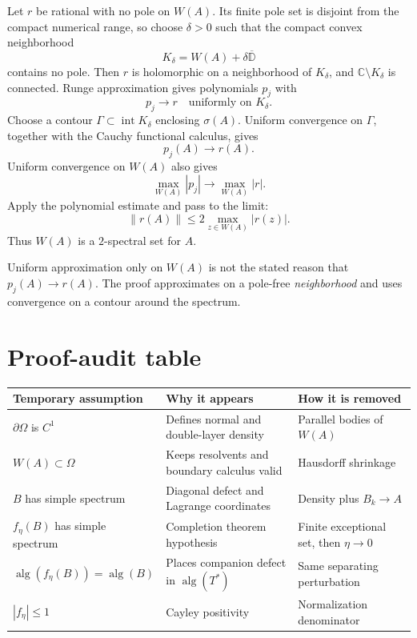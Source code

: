 \documentclass[11pt,oneside,openany]{book}
\theoremstyle{definition}
\theoremstyle{remark}
\newcommand{\C}{\mathbb C}
\newcommand{\D}{\mathbb D}
\newcommand{\alg}{\operatorname{alg}}
\newcommand{\spec}{\sigma}
\newcommand{\norm}[1]{\left\lVert #1\right\rVert}
\newcommand{\olD}{\overline{\D}}
\begin{document}
Let \(r\) be rational with no pole on \(W(A)\).  Its finite pole set is
disjoint from the compact numerical range, so choose \(\delta>0\) such
that the compact convex neighborhood
\[
  K_\delta=W(A)+\delta\olD
\]
contains no pole.  Then \(r\) is holomorphic on a neighborhood of
\(K_\delta\), and \(\C\setminus K_\delta\) is connected.  Runge
approximation gives polynomials \(p_j\) with
\[
  p_j\longrightarrow r
  \quad\text{uniformly on }K_\delta.
\]
Choose a contour
\(\Gamma\subset\operatorname{int}K_\delta\) enclosing
\(\spec(A)\).  Uniform convergence on \(\Gamma\), together with the
Cauchy functional calculus, gives
\[
  p_j(A)\longrightarrow r(A).
\]
Uniform convergence on \(W(A)\) also gives
\[
  \max_{W(A)}|p_j|
  \longrightarrow\max_{W(A)}|r|.
\]
Apply the polynomial estimate and pass to the limit:
\[
  \norm{r(A)}
  \leq2\max_{z\in W(A)}|r(z)|.
\]
Thus \(W(A)\) is a \(2\)-spectral set for \(A\).

\begin{pitfall}
Uniform approximation only on \(W(A)\) is not the stated reason that
\(p_j(A)\to r(A)\).  The proof approximates on a pole-free
\emph{neighborhood} and uses convergence on a contour around the
spectrum.
\end{pitfall}

\section{Proof-audit table}

\begin{longtable}{@{}L{0.28\textwidth}L{0.31\textwidth}
                         L{0.32\textwidth}@{}}
\toprule
\textbf{Temporary assumption}&\textbf{Why it appears}&
\textbf{How it is removed}\\
\midrule
\endhead
\(\partial\Omega\) is \(C^1\)&Defines normal and double-layer density&
Parallel bodies of \(W(A)\)\\
\(W(A)\subset\Omega\)&Keeps resolvents and boundary calculus valid&
Hausdorff shrinkage\\
\(B\) has simple spectrum&Diagonal defect and Lagrange coordinates&
Density plus \(B_k\to A\)\\
\(f_\eta(B)\) has simple spectrum&Completion theorem hypothesis&
Finite exceptional set, then \(\eta\to0\)\\
\(\alg(f_\eta(B))=\alg(B)\)&Places companion defect in
\(\alg(T^*)\)&Same separating perturbation\\
\(|f_\eta|\leq1\)&Cayley positivity&
Normalization denominator\\
\bottomrule
\end{longtable}
\end{document}
